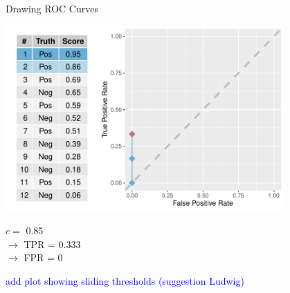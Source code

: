 \begin{vbframe}{Drawing ROC Curves}

\begin{knitrout}\scriptsize
{}\color{fgcolor}

{
\includegraphics[width=0.8\textwidth]{figure/eval_mclass_roc_sp_6}
}

\end{knitrout}

\vfill

\begin{minipage}[b]{0.3\textwidth}
  $c =$ 0.85\\ 
  $\rightarrow$ TPR = 0.333 \\
  $\rightarrow$ FPR = 0
\end{minipage}%
\begin{minipage}[b]{0.7\textwidth}
  \textcolor{blue}{add plot showing sliding thresholds (suggestion Ludwig)}
\end{minipage}

\end{vbframe}


